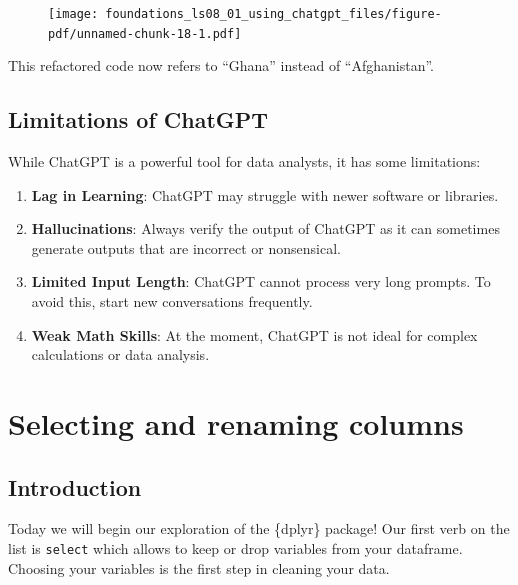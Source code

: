 \documentclass[
  letterpaper,
  DIV=11,
  numbers=noendperiod]{scrreprt}
\providecommand{\tightlist}{%
  \setlength{\itemsep}{0pt}\setlength{\parskip}{0pt}}\usepackage{longtable,booktabs,array}
\begin{document}
\begin{figure}[H]

{\centering \texttt{[image: foundations\_ls08\_01\_using\_chatgpt\_files/figure-pdf/unnamed-chunk-18-1.pdf]}

}

\end{figure}

This refactored code now refers to ``Ghana'' instead of ``Afghanistan''.

\hypertarget{limitations-of-chatgpt}{%
\section{Limitations of ChatGPT}\label{limitations-of-chatgpt}}

While ChatGPT is a powerful tool for data analysts, it has some
limitations:

\begin{enumerate}
\def\labelenumi{\arabic{enumi}.}
\tightlist
\item
  \textbf{Lag in Learning}: ChatGPT may struggle with newer software or
  libraries.
\item
  \textbf{Hallucinations}: Always verify the output of ChatGPT as it can
  sometimes generate outputs that are incorrect or nonsensical.
\item
  \textbf{Limited Input Length}: ChatGPT cannot process very long
  prompts. To avoid this, start new conversations frequently.
\item
  \textbf{Weak Math Skills}: At the moment, ChatGPT is not ideal for
  complex calculations or data analysis.
\end{enumerate}


\hypertarget{selecting-and-renaming-columns}{%
\chapter{Selecting and renaming
columns}\label{selecting-and-renaming-columns}}

\hypertarget{introduction-9}{%
\section{Introduction}\label{introduction-9}}

Today we will begin our exploration of the \{dplyr\} package! Our first
verb on the list is \texttt{select} which allows to keep or drop
variables from your dataframe. Choosing your variables is the first step
in cleaning your data.
\end{document}
